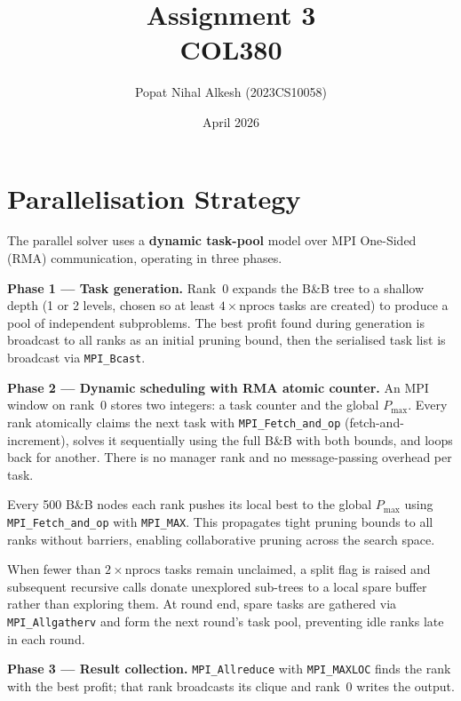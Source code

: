 \documentclass[11pt,a4paper]{article}
\title{\textbf{Assignment 3}\\[0.3em]
  \large COL380}
\author{Popat Nihal Alkesh (2023CS10058)}
\date{April 2026}
\begin{document}
  \maketitle

  \section{Parallelisation Strategy}

  The parallel solver uses a \textbf{dynamic task-pool} model over MPI One-Sided
  (RMA) communication, operating in three phases.

  \textbf{Phase 1 --- Task generation.}
  Rank~0 expands the B\&B tree to a shallow depth (1 or 2 levels, chosen so at
  least $4\times\text{nprocs}$ tasks are created) to produce a pool of independent
  subproblems.  The best profit found during generation is broadcast to all ranks
  as an initial pruning bound, then the serialised task list is broadcast via
  \texttt{MPI\_Bcast}.

  \textbf{Phase 2 --- Dynamic scheduling with RMA atomic counter.}
  An MPI window on rank~0 stores two integers: a task counter and the global
  $P_{\max}$.  Every rank atomically claims the next task with
  \texttt{MPI\_Fetch\_and\_op} (fetch-and-increment), solves it sequentially using
  the full B\&B with both bounds, and loops back for another.  There is no manager
  rank and no message-passing overhead per task.

  Every 500 B\&B nodes each rank pushes its local best to the global $P_{\max}$
  using \texttt{MPI\_Fetch\_and\_op} with \texttt{MPI\_MAX}.  This propagates
  tight pruning bounds to all ranks without barriers, enabling collaborative
  pruning across the search space.

  When fewer than $2\times\text{nprocs}$ tasks remain unclaimed, a split flag is
  raised and subsequent recursive calls donate unexplored sub-trees to a local
  spare buffer rather than exploring them.  At round end, spare tasks are gathered
  via \texttt{MPI\_Allgatherv} and form the next round's task pool, preventing
  idle ranks late in each round.

  \textbf{Phase 3 --- Result collection.}
  \texttt{MPI\_Allreduce} with \texttt{MPI\_MAXLOC} finds the rank with the best
  profit; that rank broadcasts its clique and rank~0 writes the output.

\end{document}

